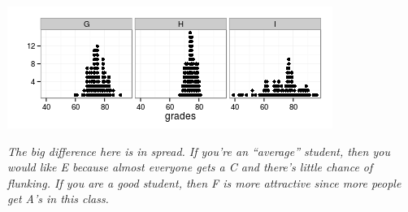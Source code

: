 \begin{enumerate}
    \includegraphics[width=.7\linewidth]{plots/3classGradeCompareSD.png}
\begin{students}
    \vspace{2cm}    
\end{students}

\begin{key}
  {\it The big difference here is in spread.  If you're an ``average''
  student, then you would like E because almost everyone gets a C and
  there's little chance of flunking.  If you are a good student, then
  F is more attractive since more people get A's in this class.}
\end{key}



\end{enumerate}
